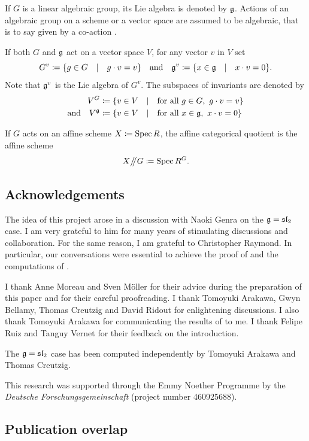 If $G$ is a linear algebraic group, its Lie algebra is denoted by $\mathfrak g$. Actions of an algebraic group on a scheme or a vector space are assumed to be algebraic, that is to say given by a co-action \cite{milne2017algebraic}. 

If both $G$ and $\mathfrak g$ act on a vector space $V$, for any vector $v$ in $V$ set
$$ G^v \coloneqq \{g \in G \quad | \quad g \cdot v = v \} \quad \text{and} \quad \mathfrak g^v \coloneqq \{x \in \mathfrak g \quad | \quad x \cdot v = 0 \}. $$
Note that $\mathfrak g^v$ is the Lie algebra of $G^v$. The subspaces of invariants are denoted by
\[ \begin{aligned}
	V^G & \coloneqq \{v \in V \quad | \quad \text{for all $g \in G$},~ g \cdot v = v \} \\
	\text{and} \quad V^\mathfrak g & \coloneqq \{v \in V \quad | \quad \text{for all $x \in \mathfrak g$},~ x \cdot v = 0 \}
\end{aligned}\]

If $G$ acts on an affine scheme $X \coloneqq \operatorname{Spec} R$, the affine categorical quotient is the affine scheme
\[ X \big/\!\!\big/ G \coloneqq \operatorname{Spec} R^G. \]


\subsection{Acknowledgements}

The idea of this project arose in a discussion with Naoki Genra on the $\mathfrak g = \mathfrak{sl}_2$ case. I am very grateful to him for many years of stimulating discussions and collaboration. For the same reason, I am grateful to Christopher Raymond. In particular, our conversations were essential to achieve the proof of  and the computations of .

I thank Anne Moreau and Sven M\"oller for their advice during the preparation of this paper and for their careful proofreading. I thank Tomoyuki Arakawa, Gwyn Bellamy, Thomas Creutzig and David Ridout for enlightening discussions. I also thank Tomoyuki Arakawa for communicating the results of \cite{arakawa2026faithful} to me. I thank Felipe Ruiz and Tanguy Vernet for their feedback on the introduction.

The $\mathfrak g = \mathfrak{sl}_2$ case has been computed independently by Tomoyuki Arakawa and Thomas Creutzig. 

This research was supported through the Emmy Noether Programme by
the \emph{Deutsche Forschungsgemeinschaft} (project number 460925688).

\subsection{Publication overlap}


